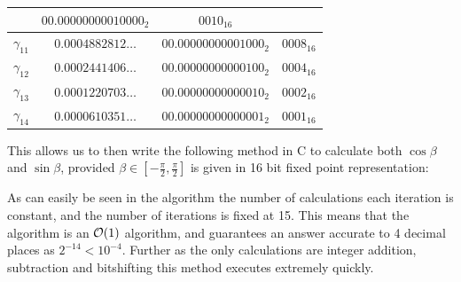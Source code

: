 {\begin{center}
\begin{tabular}{|c|c|c|c|}
		& \(\textrm{00.00000000010000}_2\)
		& \(\textrm{0010}_{16}\)\\\hline
	\(\gamma_{11}\) & \(0.0004882812\ldots\)
		& \(\textrm{00.00000000001000}_2\)
		& \(\textrm{0008}_{16}\)\\\hline
	\(\gamma_{12}\) & \(0.0002441406\ldots\)
		& \(\textrm{00.00000000000100}_2\)
		& \(\textrm{0004}_{16}\)\\\hline
	\(\gamma_{13}\) & \(0.0001220703\ldots\)
		& \(\textrm{00.00000000000010}_2\)
		& \(\textrm{0002}_{16}\)\\\hline
	\(\gamma_{14}\) & \(0.0000610351\ldots\)
		& \(\textrm{00.00000000000001}_2\)
		& \(\textrm{0001}_{16}\)\\\hline
\end{tabular}
\end{center}

This allows us to then write the following method in C to calculate both \(\cos\beta\) and \(\sin\beta\), provided \(\beta \in [-\tfrac{\pi}{2}, \tfrac{\pi}{2}]\) is given in 16 bit fixed point representation:


As can easily be seen in the algorithm the number of calculations each iteration is constant, and the number of iterations is fixed at 15. This means that the algorithm is an \(\mathcal{O}(1)\) algorithm, and guarantees an answer accurate to 4 decimal places as \(2^{-14} < 10^{-4}\). Further as the only calculations are integer addition, subtraction and bitshifting this method executes extremely quickly.\\

}
